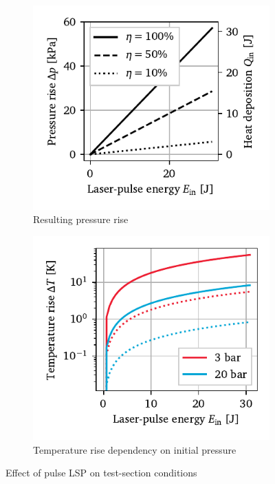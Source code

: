                 \begin{figure}[h]
                    \centering
                    \begin{subfigure}[t]{0.49\textwidth}
                        \centering
                        \includegraphics[]{assets/4 models/heatdep_static.pdf}
                        \caption{Resulting pressure rise}
                        \label{fig:heatdep_p_static}
                    \end{subfigure}
                    \hfill
                    \begin{subfigure}[t]{0.49\textwidth}
                        \centering
                        \includegraphics[]{assets/4 models/heatdep_T_static.pdf}
                        \caption{Temperature rise dependency on initial pressure}
                        \label{fig:heatdep_T_static}
                    \end{subfigure}
                    \caption{Effect of pulse LSP on test-section conditions}
                    \label{fig:heatdep_static}
                \end{figure}

